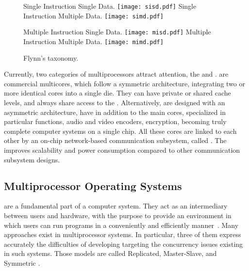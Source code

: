 			\begin{figure}[!tb]
				\centering%
				\caption{Flynn's taxonomy.}%
				\label{fig:flynn}%

					{Single Instruction Single Data.}%
					{\texttt{[image: sisd.pdf]}}%
				\hspace{1cm}%
					{Single Instruction Multiple Data.}%
					{\texttt{[image: simd.pdf]}}%

					{Multiple Instruction Single Data.}%
					{\texttt{[image: misd.pdf]}}%
				\hspace{1cm}%
					{Multiple Instruction Multiple Data.}%
					{\texttt{[image: mimd.pdf]}}%

			\end{figure}

			Currently, two categories of multiprocessors attract attention, the \cmp and \mpsoc.
			\cmps are commercial multicores, which follow a symmetric architecture,
			integrating two or more identical cores into a single die.
			They can have private or shared cache levels, and always share access
			to the \ram.
			Alternatively, \mpsocs are designed with an asymmetric architecture,
			have in addition to the main cores, specialized \cpus in particular
			functions, \eg audio and video encoders, encryption, becoming truly
			complete computer systems on a single chip.
			All these cores are linked to each other by an on-chip network-based
			communication subsystem, called \noc.
			The \noc improves scalability and power consumption compared to other
			communication subsystem designs.

		\subsection{Multiprocessor Operating Systems}
		\label{sec.multiprocessor-os}

			\oss are a fundamental part of a computer system.
			They act as an intermediary between users and hardware, with the
			purpose to provide an environment in which users can run programs
			in a conveniently and efficiently manner~\cite{Silberschatz:9ed}.
			Many \os approaches exist in multiprocessor systems.
			In particular, three of them express accurately the difficulties
			of developing \oss targeting the concurrency issues existing in
			such systems.
			Those models are called Replicated, Master-Slave, and Symmetric \os.

